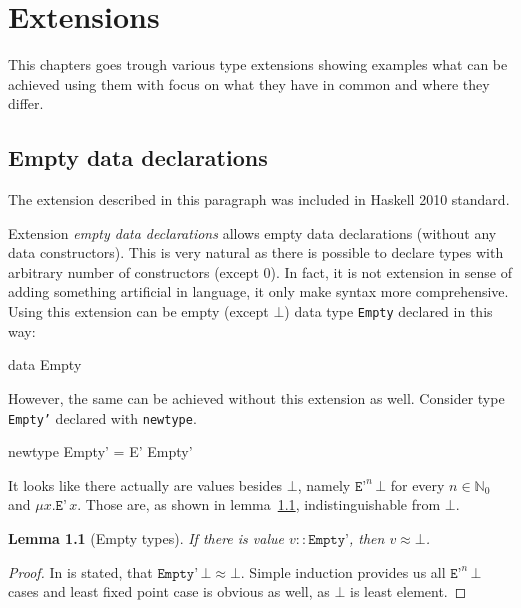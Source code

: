 \documentclass[11pt,oneside,draft]{fithesis2}
\newtheorem{lemma}{Lemma}
\theoremstyle{definition}
\begin{document}
\chapter{Extensions}

This chapters goes trough various type extensions showing examples
what can be achieved using them with focus on what they have in common
and where they differ.

\section{Empty data declarations}

The extension described in this paragraph was included in Haskell 2010 standard.

Extension \emph{empty data declarations} allows empty data declarations
(without any data constructors). This is very natural as there is possible
to declare types with arbitrary number of constructors (except 0). In
fact, it is not extension in sense of adding something artificial in
language, it only make syntax more comprehensive. Using this extension can
be empty (except \(\bot\)) data type \texttt{Empty} declared in this way:
\begin{code}
data Empty
\end{code}
However, the same can be achieved without this extension as well. Consider type \texttt{Empty'}
declared with \texttt{newtype}.
\begin{code}
newtype Empty' = E' Empty'
\end{code}
It looks like there actually are values besides \(\bot\), namely \(\texttt{E'}^n \, \bot\)
for every \(n \in \mathbb{N}_0\) and \(\mu x . \texttt{E'} \, x\).
Those are, as shown in lemma~\ref{emptyTypes}, indistinguishable from \(\bot\).

\begin{lemma}[Empty types]
\label{emptyTypes}
If there is value \(v :: \texttt{Empty'}\), then \(v \approx \bot\).
\end{lemma}

\begin{proof}
In \cite{haskell2010} is stated, that \(\texttt{Empty'} \, \bot \approx \bot\).
Simple induction provides us all \(\texttt{E'}^n \, \bot\) cases
and least fixed point case is obvious as well, as \(\bot\) is least element.
\end{proof}
\end{document}
